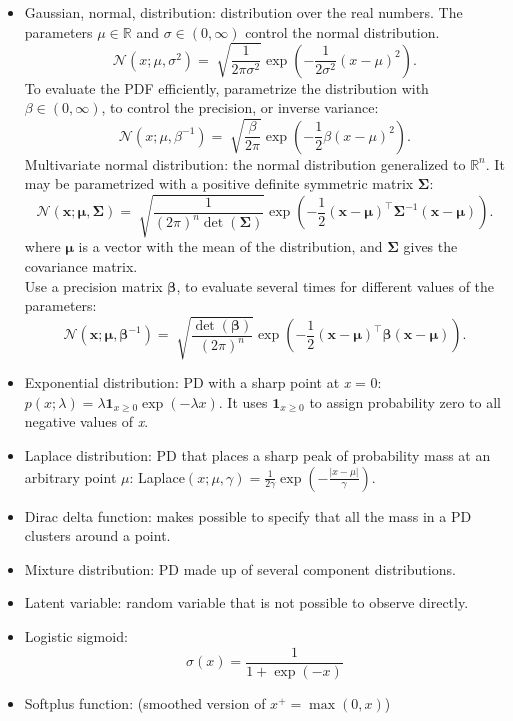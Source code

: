 \documentclass{article}
\begin{document}
\begin{itemize}
\item Gaussian, normal, distribution: distribution over the real numbers. The parameters \(\mu \in \mathbb{R}\) and \(\sigma \in (0, \infty)\) control the normal distribution.
\[
	\mathcal{N}(x; \mu, \sigma^2) = \sqrt[]{\frac{1}{2\pi\sigma^2}}\exp{\left(-\frac{1}{2\sigma^2}(x - \mu)^2\right)}.
\]
To evaluate the PDF efficiently, parametrize the distribution with \(\beta \in (0, \infty)\), to control the precision, or inverse variance:
\[
	\mathcal{N}(x; \mu, \beta^{-1}) = \sqrt[]{\frac{\beta}{2\pi}}\exp{\left(-\frac{1}{2}\beta(x - \mu)^2\right)}.
\]
Multivariate normal distribution: the normal distribution generalized to \(\mathbb{R}^n\). It may be parametrized with a positive definite symmetric matrix \(\boldsymbol{\Sigma}\):
\[
	\mathcal{N}(\boldsymbol{x}; \boldsymbol{\mu}, \boldsymbol{\Sigma}) = \sqrt[]{\frac{1}{(2\pi)^n\det{(\boldsymbol{\Sigma})}}}\exp{\left(-\frac{1}{2}(\boldsymbol{x} - \boldsymbol{\mu})^\top\boldsymbol{\Sigma}^{-1}(\boldsymbol{x} - \boldsymbol{\mu})\right)}.
\]
where \(\boldsymbol\mu\) is a vector with the mean of the distribution, and \(\boldsymbol{\Sigma}\) gives the covariance matrix.\\
Use a precision matrix \(\boldsymbol{\beta}\), to evaluate several times for different values of the parameters:
\[
	\mathcal{N}(\boldsymbol{x}; \boldsymbol{\mu}, \boldsymbol{\beta}^{-1}) = \sqrt[]{\frac{\det{(\boldsymbol{\beta})}}{(2\pi)^n}}\exp{\left(-\frac{1}{2}(\boldsymbol{x} - \boldsymbol{\mu})^\top\boldsymbol{\beta}(\boldsymbol{x} -\boldsymbol{\mu})\right)}.
\]
\item Exponential distribution: PD with a sharp point at \textit{x} = 0: \(p(x;\lambda) = \lambda\boldsymbol{1}_{x\geq0}\exp(-\lambda x)\). It uses \(\boldsymbol{1}_{x\geq0}\) to assign probability zero to all negative values of \textit{x}.
\item Laplace distribution: PD that places a sharp peak of probability mass at an arbitrary point \(\mu\): Laplace\((x; \mu, \gamma) = \frac{1}{2\gamma}\exp{( -\frac{|x - \mu|}{\gamma})} \).
\item Dirac delta function: makes possible to specify that all the mass in a PD clusters around a point.
\item Mixture distribution: PD made up of several component distributions.
\item Latent variable: random variable that is not possible to observe directly.
\item Logistic sigmoid:
\[
	\sigma(x) = \frac{1}{1 + \exp{(-x)}}
\]
\item Softplus function: (smoothed version of \(x^+ = \max{(0, x)}\))

\end{itemize}
\end{document}
